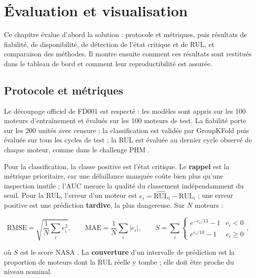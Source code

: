 \chapter{Évaluation et visualisation}\label{sec:evaluation}

\chapintro

Ce chapitre évalue d'abord la solution : protocole et métriques, puis résultats de fiabilité, de disponibilité, de détection de l'état critique et de RUL, et comparaison des méthodes. Il montre ensuite comment ces résultats sont restitués dans le tableau de bord et comment leur reproductibilité est assurée.

\section{Protocole et métriques}\label{sec:protocole}

Le découpage officiel de FD001 est respecté : les modèles sont appris sur les 100 moteurs d'entraînement et évalués sur les 100 moteurs de test. La fiabilité porte sur les 200 unités avec censure ; la classification est validée par GroupKFold puis évaluée sur tous les cycles de test ; la RUL est évaluée au dernier cycle observé de chaque moteur, comme dans le challenge PHM \cite{saxena2008damage}.

Pour la classification, la classe positive est l'état critique. Le \textbf{rappel} est la métrique prioritaire, car une défaillance manquée coûte bien plus qu'une inspection inutile ; l'AUC \cite{hanley1982} mesure la qualité du classement indépendamment du seuil. Pour la RUL, l'erreur d'un moteur est $e_i = \widehat{\mathrm{RUL}}_i - \mathrm{RUL}_i$ ; une erreur positive est une prédiction \textbf{tardive}, la plus dangereuse. Sur $N$ moteurs :

\begin{equation}\label{eq:rmse}
\mathrm{RMSE} = \sqrt{\frac1N \sum_i e_i^2}, \qquad \mathrm{MAE} = \frac1N \sum_i |e_i|, \qquad S = \sum_i \begin{cases} e^{-e_i/13} - 1 & e_i < 0 \\ e^{e_i/10} - 1 & e_i \ge 0 \end{cases},
\end{equation}

où $S$ est le score NASA \cite{saxena2008damage}. La \textbf{couverture} d'un intervalle de prédiction est la proportion de moteurs dont la RUL réelle y tombe ; elle doit être proche du niveau nominal.

